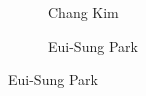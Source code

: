 \begin{frame}[plain]
\begin{figure}[h]
\begin{subfigure}{0.3\textwidth}
	\caption{Chang Kim}
	\end{subfigure}
	\begin{subfigure}{0.3\textwidth}
	\captionsetup{labelformat=empty}
	\centering
	\caption{\hspace{0cm}Eui-Sung Park}
	\end{subfigure}
	\end{figure}
\end{frame}



